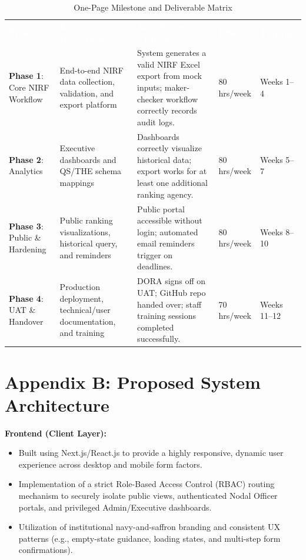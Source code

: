 \documentclass[11pt]{article}
\renewcommand{\arraystretch}{1.15}
\begin{document}
\begin{table}[h]
\centering
\renewcommand{\arraystretch}{1.4}
\begin{tabular}{p{2cm} p{3.5cm} p{4.5cm} p{1.8cm} p{2.2cm}}
\rowcolor{primary}
\textcolor{white}{\textbf{Phase}} & \textcolor{white}{\textbf{Key Deliverables}} & \textcolor{white}{\textbf{Acceptance Criteria}} & \textcolor{white}{\textbf{Effort}} & \textcolor{white}{\textbf{Timeline}} \\
\rowcolor{lightbg}
\textbf{Phase 1}: Core NIRF Workflow & End-to-end NIRF data collection, validation, and export platform & System generates a valid NIRF Excel export from mock inputs; maker-checker workflow correctly records audit logs. & 80 hrs/week & Weeks 1--4 \\
\rowcolor{white}
\textbf{Phase 2}: Analytics & Executive dashboards and QS/THE schema mappings & Dashboards correctly visualize historical data; export works for at least one additional ranking agency. & 80 hrs/week & Weeks 5--7 \\
\rowcolor{lightbg}
\textbf{Phase 3}: Public \& Hardening & Public ranking visualizations, historical query, and reminders & Public portal accessible without login; automated email reminders trigger on deadlines. & 80 hrs/week & Weeks 8--10 \\
\rowcolor{white}
\textbf{Phase 4}: UAT \& Handover & Production deployment, technical/user documentation, and training & DORA signs off on UAT; GitHub repo handed over; staff training sessions completed successfully. & 70 hrs/week & Weeks 11--12 \\
\end{tabular}
\caption{One-Page Milestone and Deliverable Matrix}
\end{table}

\vspace{1cm}
\section{Appendix B: Proposed System Architecture}

\textbf{Frontend (Client Layer):}
\begin{itemize}[leftmargin=1.4em, itemsep=3pt]
\item Built using Next.js/React.js to provide a highly responsive, dynamic user experience across desktop and mobile form factors.
\item Implementation of a strict Role-Based Access Control (RBAC) routing mechanism to securely isolate public views, authenticated Nodal Officer portals, and privileged Admin/Executive dashboards.
\item Utilization of institutional navy-and-saffron branding and consistent UX patterns (e.g., empty-state guidance, loading states, and multi-step form confirmations).
\end{itemize}
\end{document}
